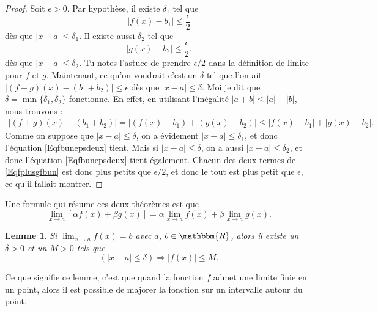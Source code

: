 \documentclass[a4paper,12pt]{book}
\newcommand{\eR}{\mathbbm{R}}
\newcounter{numtho}
\theoremstyle{mes_exemples}	\newtheorem{exemple}[numtho]{Exemple}
\theoremstyle{mes_tho}
\newtheorem{lemma}[numtho]{Lemme}
\begin{document}
\begin{proof}
	Soit $\epsilon>0$. Par hypothèse, il existe $\delta_1$ tel que
	\begin{equation}	\label{Eqfbunepsdeux}
	  | f(x)-b_1 |\leq \frac{ \epsilon }{ 2 }
	\end{equation}
	dès que $| x-a |\leq\delta_1$. Il existe aussi $\delta_2$ tel que 
	\begin{equation} 	\label{Eqgbdeuxepsdeux}
	  | g(x)-b_2 |\leq \frac{ \epsilon }{ 2 }.
	\end{equation}
	dès que $| x-a |\leq \delta_2$. Tu notes l'astuce de prendre $\epsilon/2$ dans la définition de limite pour $f$ et $g$. Maintenant, ce qu'on voudrait c'est un $\delta$ tel que l'on ait $| (f+g)(x)-(b_1+b_2) |\leq \epsilon$ dès que $| x-a |\leq \delta$. Moi je dit que $\delta=\min\{ \delta_1,\delta_2 \}$ fonctionne. En effet, en utilisant l'inégalité $| a+b |\leq | a |+| b |$, nous trouvons :
	\begin{align}
	| (f+g)(x)-(b_1+b_2) |=| (f(x)-b_1)+(g(x)-b_2) |
			\leq | f(x)-b_1 |+| g(x)-b_2 |.		\label{Eqfplusgfbun}
	\end{align}
	Comme on suppose que $| x-a |\leq\delta$, on a évidement $| x-a |\leq\delta_1$, et donc l'équation \eqref{Eqfbunepsdeux} tient. Mais si $| x-a |\leq\delta$, on a aussi $| x-a |\leq\delta_2$, et donc l'équation  \eqref{Eqfbunepsdeux} tient également. Chacun des deux termes de \eqref{Eqfplusgfbun} est donc plus petits que $\epsilon/2$, et donc le tout est plus petit que $\epsilon$, ce qu'il fallait montrer.

\end{proof}

Une formule qui résume ces deux théorèmes est que
\begin{equation}	\label{EqLimLinRes}
	\lim_{x\to a}[\alpha f(x)+\beta g(x)]=\alpha\lim_{x\to a}f(x)+\beta\lim_{x\to a}g(x).
\end{equation}

\begin{lemma}		\label{LemLimMajorableVois}
	Si $\lim_{x\to a}f(x)=b$ avec $a$, $b\in\eR$, alors il existe un $\delta>0$ et un $M>0$ tels que 
	\[ 
		(| x-a |\leq\delta)\Rightarrow | f(x) |\leq M.
	\]

\end{lemma}

Ce que signifie ce lemme, c'est que quand la fonction $f$ admet une limite finie en un point, alors il est possible de majorer la fonction sur un intervalle autour du point.
\end{document}
